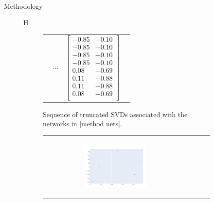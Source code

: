 \documentclass[12pt]{amsbook}
\begin{document}
\begin{chapter}{Methodology}
\begin{figure}{H}
\begin{subfigure}[c]{1\textwidth}
\begin{tabular}{llll}
                &
                $\cdots$
                &
                
                    $\begin{bmatrix}
                        -0.85 &  -0.10\\
                        -0.85 &  -0.10\\
                        -0.85 &  -0.10\\
                        -0.85 &  -0.10\\
                         0.08 &  -0.69\\
                         0.11 &  -0.88\\
                         0.11 &  -0.88\\
                         0.08 &  -0.69\\
                    \end{bmatrix}$
                \end{tabular}
                \caption{Sequence of truncated SVDs associated with the networks in \cref{method nets}.}
                \label{method embed}
            \end{subfigure}
            
            \begin{subfigure}[c]{1\textwidth}
                \begin{tabular}{llll}
                \begin{subfigure}[c]{0.31\textwidth}
                    \centering
                    \begin{subfigure}[p]{1\textwidth}
                        \includegraphics[width=\linewidth]{../Code/Plots/examples/plot 1.png}
                        

\end{subfigure}
\end{subfigure}
\end{tabular}
\end{subfigure}
\end{figure}
\end{chapter}
\end{document}
